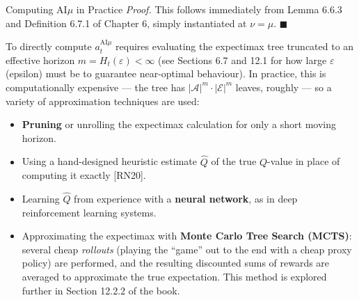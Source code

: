 \documentclass[aspectratio=169,10pt]{beamer}
\newcommand{\Acal}{\mathcal{A}}
\newcommand{\Ecal}{\mathcal{E}}
\begin{document}
\begin{frame}{Computing AI$\mu$ in Practice}
  \textit{Proof.} This follows immediately from Lemma 6.6.3 and Definition
  6.7.1 of Chapter 6, simply instantiated at $\nu=\mu$. $\blacksquare$

  \vspace{2mm}
  To directly compute $a_t^{\mathrm{AI}\mu}$ requires evaluating the
  expectimax tree truncated to an effective horizon
  $m = H_t(\varepsilon) < \infty$ (see Sections 6.7 and 12.1 for how large
  $\varepsilon$ (epsilon) must be to guarantee near-optimal behaviour). In
  practice, this is computationally expensive --- the tree has
  $|\Acal|^{m}\cdot|\Ecal|^m$ leaves, roughly --- so a variety of
  approximation techniques are used:
  \begin{itemize}
    \item \textbf{Pruning} or unrolling the expectimax calculation for only
      a short moving horizon.
    \item Using a hand-designed heuristic estimate $\widehat{Q}$ of the true
      $Q$-value in place of computing it exactly [RN20].
    \item Learning $\widehat{Q}$ from experience with a \textbf{neural
      network}, as in deep reinforcement learning systems.
    \item Approximating the expectimax with \textbf{Monte Carlo Tree
      Search (MCTS)}: several cheap \emph{rollouts} (playing the ``game''
      out to the end with a cheap proxy policy) are performed, and the
      resulting discounted sums of rewards are averaged to approximate the
      true expectation. This method is explored further in Section 12.2.2
      of the book.
  \end{itemize}
\end{frame}
\end{document}
